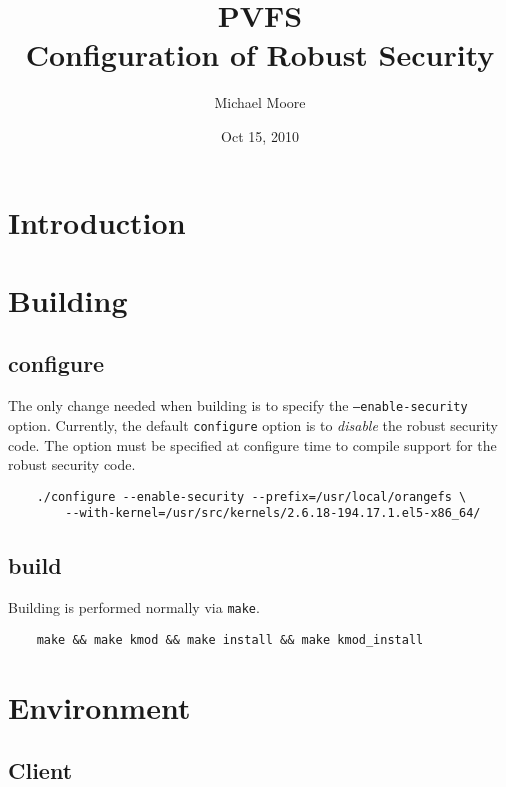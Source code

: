 \documentclass[11pt, letterpaper]{article}
\title{PVFS\\Configuration of Robust Security}
\author{ Michael Moore }
\date{ Oct 15, 2010 }
\begin{document}
\maketitle

\tableofcontents

\newpage

\thispagestyle{plain}


\section{Introduction}

\section{Building}

\subsection{configure}
The only change needed when building is to specify the 
\texttt{--enable-security} option. Currently, the default \texttt{configure} 
option is to \emph{disable} the robust security code. The option must be 
specified at configure time to compile support for the robust security code.

\begin{verbatim}
    ./configure --enable-security --prefix=/usr/local/orangefs \
        --with-kernel=/usr/src/kernels/2.6.18-194.17.1.el5-x86_64/
\end{verbatim}

\subsection{build}
Building is performed normally via \texttt{make}.

\begin{verbatim}
    make && make kmod && make install && make kmod_install
\end{verbatim}

\section{Environment}

\subsection{Client}
\end{document}
